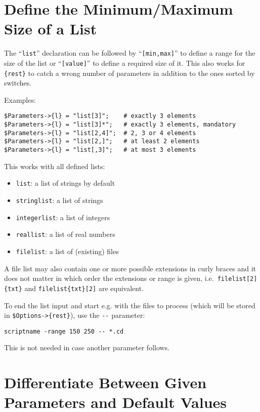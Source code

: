 \documentclass[12pt, a4paper]{article}
\begin{document}
\section{Define the Minimum/Maximum Size of a List}

The ``\verb'list''' declaration can be followed by ``\verb'[min,max]''' to define a range for the size of the list or ``\verb'[value]''' to define a required size of it. This also works for \verb'{rest}' to catch a wrong number of parameters in addition to the ones sorted by switches.

Examples:

\begin{verbatim}
$Parameters->{l} = "list[3]";    # exactly 3 elements
$Parameters->{l} = "list[3]*";   # exactly 3 elements, mandatory
$Parameters->{l} = "list[2,4]";  # 2, 3 or 4 elements
$Parameters->{l} = "list[2,]";   # at least 2 elements
$Parameters->{l} = "list[,3]";   # at most 3 elements
\end{verbatim}

This works with all defined lists:
\begin{itemize}
\item \verb'list': a list of strings by default
\item \verb'stringlist': a list of strings
\item \verb'integerlist': a list of integers
\item \verb'reallist': a list of real numbers
\item \verb'filelist': a list of (existing) files
\end{itemize}

A file list may also contain one or more possible extensions in curly braces and it does not matter in which order the extensions or range is given, i.e.\ \verb'filelist[2]{txt}' and \verb'filelist{txt}[2]' are equivalent.

To end the list input and start e.g. with the files to process (which will be stored
in \verb'$Options->{rest}'), use the \verb'--' parameter:

\begin{verbatim}
scriptname -range 150 250 -- *.cd
\end{verbatim}

This is not needed in case another parameter follows.


\section{Differentiate Between Given Parameters and Default Values}
\end{document}
